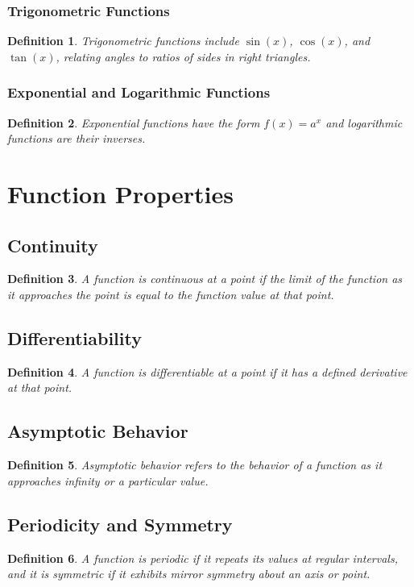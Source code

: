 \documentclass[a4paper,12pt]{book}
\newtheorem{definition}{Definition}
\begin{document}
\subsubsection{Trigonometric Functions}
\begin{definition}
Trigonometric functions include \( \sin(x) \), \( \cos(x) \), and \( \tan(x) \), relating angles to ratios of sides in right triangles.
\end{definition}

\subsubsection{Exponential and Logarithmic Functions}
\begin{definition}
Exponential functions have the form \( f(x) = a^x \) and logarithmic functions are their inverses.
\end{definition}

\section{Function Properties}
\subsection{Continuity}
\begin{definition}
A function is continuous at a point if the limit of the function as it approaches the point is equal to the function value at that point.
\end{definition}

\subsection{Differentiability}
\begin{definition}
A function is differentiable at a point if it has a defined derivative at that point.
\end{definition}

\subsection{Asymptotic Behavior}
\begin{definition}
Asymptotic behavior refers to the behavior of a function as it approaches infinity or a particular value.
\end{definition}

\subsection{Periodicity and Symmetry}
\begin{definition}
A function is periodic if it repeats its values at regular intervals, and it is symmetric if it exhibits mirror symmetry about an axis or point.
\end{definition}
\end{document}

